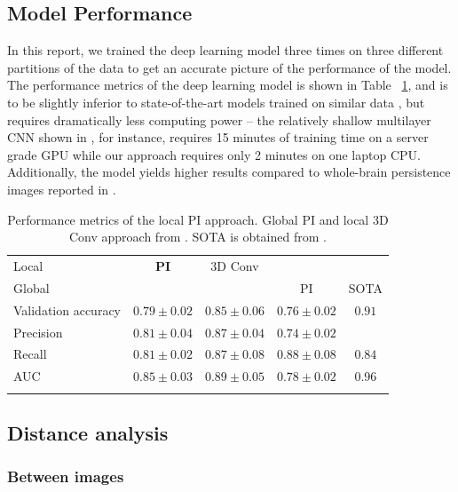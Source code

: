 \documentclass{article}
\begin{document}
\subsection{Model Performance}

In this report, we trained the deep learning model three times on three different partitions of the data to get an accurate picture of the performance of the model. The performance metrics of the deep learning model is shown in Table ~\ref{tab:performance}, and is to be slightly inferior to state-of-the-art models trained on similar data \citep{wen2020convolutional}, but requires dramatically less computing power -- the relatively shallow multilayer CNN shown in \citep{bruningk2020image}, for instance, requires 15 minutes of training time on a server grade GPU while our approach requires only 2 minutes on one laptop CPU. Additionally, the model yields higher results compared to whole-brain persistence images reported in \citep{bruningk2020image}.

\begin{table}[b]
  \centering
  \begin{tabular}{lcccc}
    \toprule
    Local & \textbf{PI} & 3D Conv & & \\
    Global &&& PI & SOTA \\
    \midrule
    Validation accuracy & $0.79\pm 0.02$ & $0.85\pm 0.06$ & $ 0.76\pm 0.02$ & $0.91$\\
    Precision & $0.81\pm 0.04$  & $0.87\pm0.04$ &  $0.74\pm 0.02$& \\
    Recall & $0.81\pm 0.02$ & $0.87\pm0.08$ & $0.88\pm 0.08$ &$0.84$\\
    AUC & $0.85\pm 0.03$ & $0.89\pm0.05$ &  $ 0.78\pm 0.02$ & $0.96$\\
    \bottomrule
    \vspace{1pt}
  \end{tabular}
  \caption{Performance metrics of the local PI approach. Global PI and local 3D Conv approach from \citep{bruningk2020image}. SOTA is obtained from \citep{liu2018anatomical}.}
  \label{tab:performance}
\end{table}

\subsection{Distance analysis}

\subsubsection{Between images}\label{sec:results_between_images}
\end{document}
